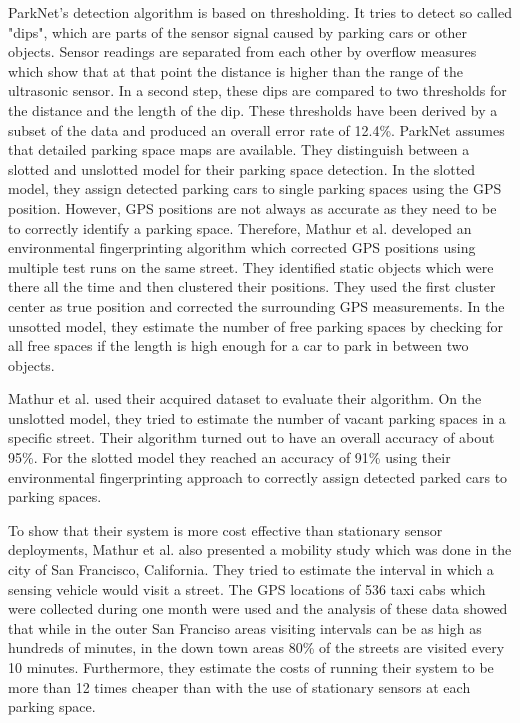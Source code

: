 ParkNet's detection algorithm is based on thresholding. It tries to detect so called "dips", which are parts of the sensor signal caused by parking cars or other objects. Sensor readings are separated from each other by overflow measures which show that at that point the distance is higher than the range of the ultrasonic sensor. In a second step, these dips are compared to two thresholds for the distance and the length of the dip. These thresholds have been derived by a subset of the data and produced an overall error rate of 12.4\%. ParkNet assumes that detailed parking space maps are available. They distinguish between a slotted and unslotted model for their parking space detection. In the slotted model, they assign detected parking cars to single parking spaces using the GPS position. However, GPS positions are not always as accurate as they need to be to correctly identify a parking space. Therefore, Mathur et al. developed an environmental fingerprinting algorithm which corrected GPS positions using multiple test runs on the same street. They identified static objects which were there all the time and then clustered their positions. They used the first cluster center as true position and corrected the surrounding GPS measurements. In the unsotted model, they estimate the number of free parking spaces by checking for all free spaces if the length is high enough for a car to park in between two objects.

Mathur et al. used their acquired dataset to evaluate their algorithm. On the unslotted model, they tried to estimate the number of vacant parking spaces in a specific street. Their algorithm turned out to have an overall accuracy of about 95\%. For the slotted model they reached an accuracy of 91\% using their environmental fingerprinting approach to correctly assign detected parked cars to parking spaces.

To show that their system is more cost effective than stationary sensor deployments, Mathur et al. also presented a mobility study which was done in the city of San Francisco, California. They tried to estimate the interval in which a sensing vehicle would visit a street. The GPS locations of 536 taxi cabs which were collected during one month were used and the analysis of these data showed that while in the outer San Franciso areas visiting intervals can be as high as hundreds of minutes, in the down town areas 80\% of the streets are visited every 10 minutes. Furthermore, they estimate the costs of running their system to be more than 12 times cheaper than with the use of stationary sensors at each parking space.

